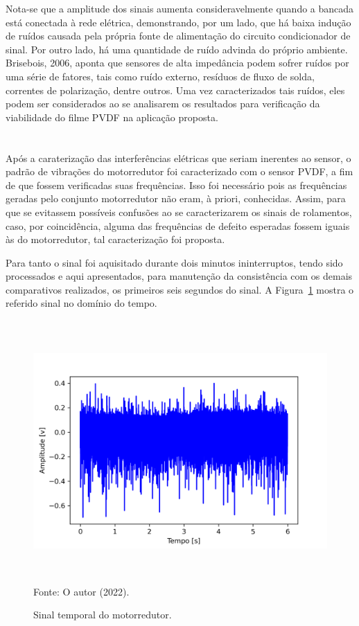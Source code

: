 \documentclass[
	12pt,				
	oneside,			
	a4paper,			
	english,			
	brazil,			
	]{abntex2ppgsi}
\begin{document}
{{{{{Nota-se que a amplitude dos sinais aumenta consideravelmente quando a bancada está conectada à rede elétrica, demonstrando, por um lado, que há baixa indução de ruídos causada pela própria fonte de alimentação do circuito condicionador de sinal. Por outro lado, há uma quantidade de ruído advinda do próprio ambiente. Brisebois, 2006, aponta que sensores de alta impedância podem sofrer ruídos por uma série de fatores, tais como ruído externo, resíduos de fluxo de solda, correntes de polarização, dentre outros. Uma vez caracterizados tais ruídos, eles podem ser considerados ao se analisarem os resultados para verificação da viabilidade do filme PVDF na aplicação proposta.

\section{}

Após a caraterização das interferências elétricas que seriam inerentes ao sensor, o padrão de vibrações do motorredutor foi caracterizado com o sensor PVDF, a fim de que fossem verificadas suas frequências. Isso foi necessário pois as frequências geradas pelo conjunto motorredutor não eram, à priori, conhecidas. Assim, para que se evitassem possíveis confusões ao se caracterizarem os sinais de rolamentos, caso, por coincidência, alguma das frequências de defeito esperadas fossem iguais às do motorredutor, tal caracterização foi proposta. 

Para tanto o sinal foi aquisitado durante dois minutos ininterruptos, tendo sido processados e aqui apresentados, para manutenção da consistência com os demais comparativos realizados, os primeiros seis segundos do sinal. A Figura~\ref{motorredutor} mostra o referido sinal no domínio do tempo.

\begin{figure}[H]
\centering
\caption {Sinal temporal do motorredutor.}
\includegraphics[width=\textwidth,height=100mm,keepaspectratio]{Caso0/motorredutor} \\
Fonte: O autor (2022).
\label{motorredutor}
\end{figure} 

}}}}}
\end{document}
